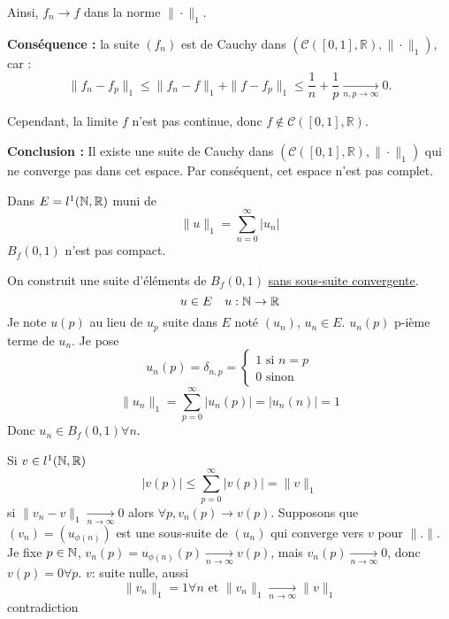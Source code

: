 \begin{preuve}
Ainsi, $f_n \to f$ dans la norme $\| \cdot \|_1$.

\medskip

\textbf{Conséquence :} la suite $(f_n)$ est de Cauchy dans $\left( \mathcal{C}([0,1], \mathbb{R}), \| \cdot \|_1 \right)$, car :
\[
\|f_n - f_p\|_1 \le \|f_n - f\|_1 + \|f - f_p\|_1 \le \frac{1}{n} + \frac{1}{p} \xrightarrow[n,p \to \infty]{} 0.
\]

Cependant, la limite $f$ n’est pas continue, donc $f \notin \mathcal{C}([0,1], \mathbb{R})$.

\medskip

\textbf{Conclusion :} Il existe une suite de Cauchy dans $\left( \mathcal{C}([0,1], \mathbb{R}), \| \cdot \|_1 \right)$ qui ne converge pas dans cet espace. Par conséquent, cet espace n’est pas complet.

\end{preuve}
\begin{lemma}
    Dans $E = l^{1}(\mathbb{N}, \mathbb{R})$ muni de
    \[
    \|u\|_1 = \sum_{n=0}^{\infty} |u_n|
    \] 
    $B_f(0, 1)$ n'est pas compact.
\end{lemma}
\begin{preuve}
    On construit une suite d'éléments de $B_f(0, 1)$ \underline{sans sous-suite convergente}.
    \[
    u \in E \quad u: \mathbb{N} \to \mathbb{R}
    \] 
    Je note $u(p)$ au lieu de  $u_p$ suite dans  $E$ noté  $(u_n)$,  $u_n \in E$. $u_n(p)$ p-ième terme de  $u_n$. Je pose  
    \[
    u_n(p) = \delta_{n, p} = \begin{cases}
        1 \text{ si } n = p\\
        0 \text{ sinon}
    \end{cases}
    \] 
    \[
    \|u_n\|_1 = \sum_{p=0}^{\infty} |u_n(p)| = |u_n(n)| = 1
    \] 
    Donc $u_n \in B_f(0, 1) \forall n$.
    \par
    Si $v \in l^1(\mathbb{N}, \mathbb{R})$
    \[
    |v(p)| \le \sum_{p=0}^{\infty} |v(p)| = \|v\|_1
    \] 
    si $\|v_n - v\|_1 \xrightarrow[n \to \infty]{} 0$ alors $\forall p, v_n(p) \to v(p)$. Supposons que $(v_n) = (u_{\phi(n)})$ est une sous-suite de $(u_n)$ qui converge vers  $v$ pour  $\| . \|$. Je fixe $p \in \mathbb{N}$, $v_n(p) = u_{\phi(n)}(p) \xrightarrow[n \to \infty]{} v(p)$, mais $v_n(p) \xrightarrow[n \to \infty]{} 0$, donc $v(p) = 0 \forall p$. $v$: suite nulle, aussi 
     \[
    \|v_n\|_1 = 1 \forall n \text{ et } \|v_n\|_1 \xrightarrow[n \to \infty]{} \|v\|_1
    \] 
    contradiction
\end{preuve}
